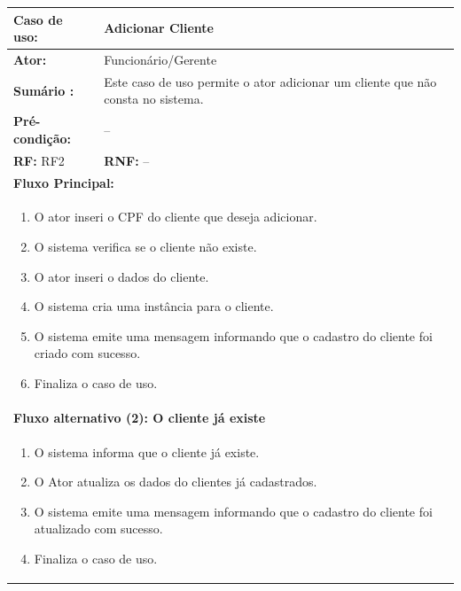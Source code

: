 \documentclass[
	12pt,				%
	openright,
	oneside,			%
	a4paper,			%
	chapter=TITLE,		%
	brazil				%
	]{abntex2}
\begin{document}
\begin{table}[h]
\centering
\begin{tabular}{|p{3cm}|p{3cm}|p{3cm}|p{3cm}|}
\hline
\textbf{Caso de uso:}             & \multicolumn{3}{p{9cm}|}{Adicionar Cliente}                    						 \\ \hline
\textbf{Ator:}                 & \multicolumn{3}{p{9cm}|}{Funcionário/Gerente}                   						 \\ \hline
\textbf{Sumário :}                & \multicolumn{3}{p{9cm}|}{Este caso de uso permite o ator adicionar um cliente que não consta no sistema.}         				\\ \hline
\textbf{Pré-condição:}            & \multicolumn{3}{p{9cm}|}{ -- }                                   				    \\ \hline
\multicolumn{2}{|p{6cm}|}{\textbf{RF:} RF2 }                  & \multicolumn{2}{p{6cm}|}{\textbf{RNF:} -- }     	    \\ \hline
\multicolumn{4}{|p{12cm}|}{\textbf{Fluxo Principal:}}                                                					\\ \hline
\multicolumn{4}{|p{12cm}|}{%
\begin{enumerate}
  \item O ator inseri o CPF do cliente que deseja adicionar.
  \item O sistema verifica se o cliente não existe.
  \item O ator inseri o dados do cliente.
  \item O sistema cria uma instância para o cliente.
  \item O sistema emite uma mensagem informando que o cadastro do cliente foi criado com sucesso.
  \item Finaliza o caso de uso.
\end{enumerate}}                                                               				 							\\ \hline

\multicolumn{4}{|p{12cm}|}{\textbf{Fluxo alternativo (2): O cliente já existe}}            					\\ \hline
\multicolumn{4}{|p{12cm}|}{%
\begin{enumerate}
  \item O sistema informa que o cliente já existe.
  \item O Ator atualiza os dados do clientes já cadastrados.
  \item O sistema emite uma mensagem informando que o cadastro do cliente foi atualizado com sucesso.
  \item Finaliza o caso de uso.
\end{enumerate}}                                                               				 							\\ \hline


\end{tabular}
\end{table}
\end{document}
